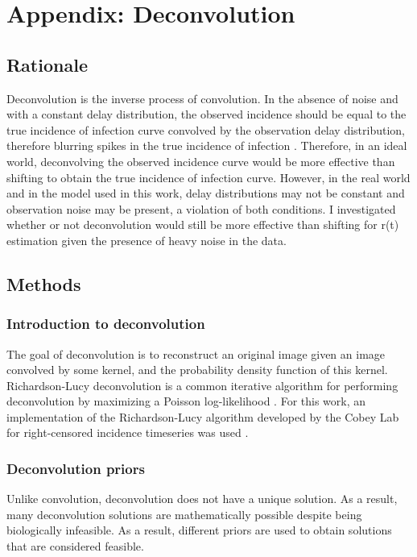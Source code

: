 \documentclass{article}
\begin{document}
\section{Appendix: Deconvolution}
\subsection{Rationale}
Deconvolution is the inverse process of convolution. In the absence of noise and with a constant delay distribution, the observed incidence should be equal to the true incidence of infection curve convolved by the observation delay distribution, therefore blurring spikes in the true incidence of infection \cite{Gostic}. Therefore, in an ideal world, deconvolving the observed incidence curve would be more effective than shifting to obtain the true incidence of infection curve. However, in the real world and in the model used in this work, delay distributions may not be constant and observation noise may be present, a violation of both conditions. I investigated whether or not deconvolution would still be more effective than shifting for r(t) estimation given the presence of heavy noise in the data.

\subsection{Methods}
\subsubsection{Introduction to deconvolution}
The goal of deconvolution is to reconstruct an original image given an image convolved by some kernel, and the probability density function of this kernel. Richardson-Lucy deconvolution is a common iterative algorithm for performing deconvolution by maximizing a Poisson log-likelihood \cite{RLLoss}. For this work, an implementation of the Richardson-Lucy algorithm developed by the Cobey Lab for right-censored incidence timeseries was used \cite{Gostic}.

\subsubsection{Deconvolution priors}
Unlike convolution, deconvolution does not have a unique solution. As a result, many deconvolution solutions are mathematically possible despite being biologically infeasible. As a result, different priors are used to obtain solutions that are considered feasible.
\end{document}
